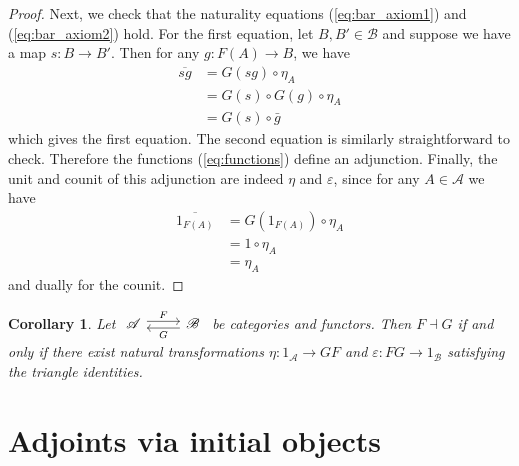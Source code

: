 \documentclass[10pt,oneside]{book}
\def\~#1{\mathscr{#1}}
\newcommand{\ve}{\varepsilon}
\theoremstyle{plain}
\newtheorem{cor}[thm]{Corollary}
\theoremstyle{definition}
\theoremstyle{remark}
\numberwithin{equation}{section}
\numberwithin{figure}{section}
\begin{document}
\begin{proof}
Next, we check that the naturality equations (\ref{eq:bar_axiom1}) and (\ref{eq:bar_axiom2}) hold. For the first equation, let $B, B' \in \~B$ and suppose we have a map $s: B \to B'$. Then for any $g: F(A) \to B$, we have
\begin{align*}
    \overline{sg} &= G(sg) \circ \eta_A  \\
    &= G(s) \circ G(g) \circ \eta_A   \\
    &= G(s) \circ \bar{g} 
\end{align*}
which gives the first equation. The second equation is similarly straightforward to check. Therefore the functions (\ref{eq:functions}) define an adjunction. Finally, the unit and counit of this adjunction are indeed $\eta$ and $\ve$, since for any $A \in \~A$ we have
\begin{align*}
\overline{1_{F(A)}} &= G(1_{F(A)}) \circ \eta_A  \\
                    &= 1 \circ \eta_A \\
                    &= \eta_A
\end{align*}
and dually for the counit.
\end{proof} 

\begin{cor}
    Let $\begin{tikzcd}
    {\~A} & {\~B}
    \arrow["F", shift left, from=1-1, to=1-2]
    \arrow["G", shift left, from=1-2, to=1-1]
\end{tikzcd}$ be categories and functors. Then $F \dashv G$ if and only if there exist natural transformations $\eta: 1_{\~A} \to GF$ and $\ve: FG \to 1_{\~B}$ satisfying the triangle identities.
\end{cor}

\section{Adjoints via initial objects}
\end{document}
